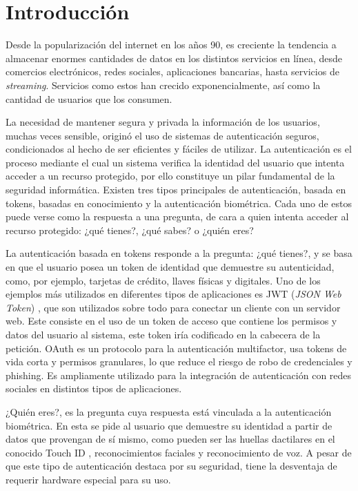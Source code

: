 \chapter*{Introducción}\label{chapter:introduction}
Desde la popularización del internet en los años 90, es creciente la tendencia a almacenar enormes cantidades de datos en los distintos servicios en línea, desde comercios electrónicos, redes sociales, aplicaciones bancarias, hasta servicios de \textit{streaming}. Servicios como estos han crecido exponencialmente, así como la cantidad de usuarios que los consumen. 

La necesidad de mantener segura y privada la información de los usuarios, muchas veces sensible, originó el uso de sistemas de autenticación seguros, condicionados al hecho de ser eficientes y fáciles de utilizar. La autenticación es el proceso mediante el cual un sistema verifica la identidad del usuario que intenta acceder a un recurso protegido, por ello constituye un pilar fundamental de la seguridad informática. Existen tres tipos principales de autenticación, basada en tokens, basadas en conocimiento y la autenticación biométrica. Cada uno de estos puede verse como la respuesta a una pregunta, de cara a quien intenta acceder al recurso protegido: ¿qué tienes?, ¿qué sabes? o ¿quién eres?

La autenticación basada en tokens responde a la pregunta: ¿qué tienes?, y se basa en que el usuario posea un token de identidad que demuestre su autenticidad, como, por ejemplo, tarjetas de crédito, llaves físicas y digitales. Uno de los ejemplos más utilizados en diferentes tipos de aplicaciones es JWT (\textit{JSON Web Token})  \cite{massimo_nardone__2023}, que son utilizados sobre todo para conectar un cliente con un servidor web. Este consiste en el uso de un token de acceso que contiene los permisos y datos del usuario al sistema, este token iría codificado en la cabecera de la petición. OAuth \cite{aravind_ayyagiri__2023} es un protocolo para la autenticación multifactor, usa tokens de vida corta y permisos granulares, lo que reduce el riesgo de robo de credenciales y phishing. Es ampliamente utilizado para la integración de autenticación con redes sociales en distintos tipos de aplicaciones.

¿Quién eres?, es la pregunta cuya respuesta está vinculada a la autenticación biométrica. En esta se pide al usuario que demuestre su identidad a partir de datos que provengan de sí mismo, como pueden ser las huellas dactilares en el conocido Touch ID \cite{liu_jin__2019}, reconocimientos faciales\cite{nur_dua_fathansyah_atan__2024} y reconocimiento de voz. A pesar de que este tipo de autenticación destaca por su seguridad, tiene la desventaja de requerir hardware especial para su uso. 

